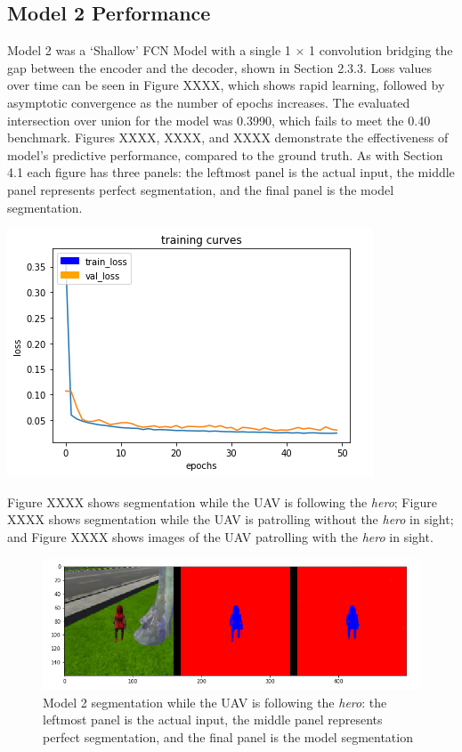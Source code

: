 \documentclass[a4paper]{article}
\begin{document}
\subsection{Model 2 Performance}
\begin{minipage}{0.45\textwidth}
Model 2 was a `Shallow' FCN Model with a single 1 $\times$ 1 convolution bridging the gap between the encoder and the decoder, shown in Section 2.3.3. Loss values over time can be seen in Figure XXXX, which shows rapid learning, followed by asymptotic convergence as the number of epochs increases. The evaluated intersection over union for the model was 0.3990, which fails to meet the 0.40 benchmark. Figures XXXX, XXXX, and XXXX demonstrate the effectiveness of model's predictive performance, compared to the ground truth. As with Section 4.1 each figure has three panels: the leftmost panel is the actual input, the middle panel represents perfect segmentation, and the final panel is the model segmentation.
\end{minipage}
\hspace{1cm}
\begin{minipage}{0.45\textwidth}
\centering
\includegraphics[scale=0.5]{Model_2}
\end{minipage}

\vspace{0.5cm}

Figure XXXX shows segmentation while the UAV is following the \textit{hero}; Figure XXXX shows segmentation while the UAV is patrolling without the \textit{hero} in sight; and Figure XXXX shows images of the UAV patrolling with the \textit{hero} in sight.
\begin{figure}[h]
\centering
\includegraphics[scale=0.4]{model_2_1}
\caption{Model 2 segmentation while the UAV is following the \textit{hero}: the leftmost panel is the actual input, the middle panel represents perfect segmentation, and the final panel is the model segmentation}
\end{figure}
\end{document}
